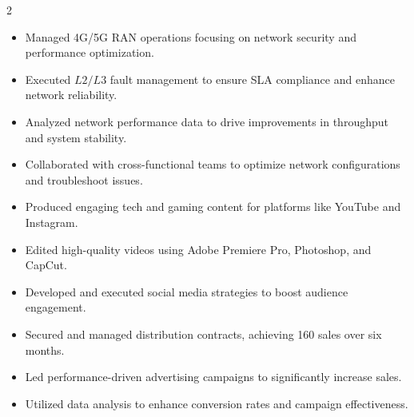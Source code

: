\documentclass[10pt,a4paper,ragged2e,withhyper]{altacv}
\begin{document}


\makecvheader

\begin{paracol}{2}



\begin{itemize}
\item Managed 4G/5G RAN operations focusing on network security and performance optimization.
\item Executed $L2/L3$ fault management to ensure SLA compliance and enhance network reliability.
\item Analyzed network performance data to drive improvements in throughput and system stability.
\item Collaborated with cross-functional teams to optimize network configurations and troubleshoot issues.
\end{itemize}

\divider

\begin{itemize}
\item Produced engaging tech and gaming content for platforms like YouTube and Instagram.
\item Edited high-quality videos using Adobe Premiere Pro, Photoshop, and CapCut.
\item Developed and executed social media strategies to boost audience engagement.
\end{itemize}

\divider

\begin{itemize}
\item Secured and managed distribution contracts, achieving 160 sales over six months.
\item Led performance-driven advertising campaigns to significantly increase sales.
\item Utilized data analysis to enhance conversion rates and campaign effectiveness.
\end{itemize}


\end{paracol}
\end{document}
